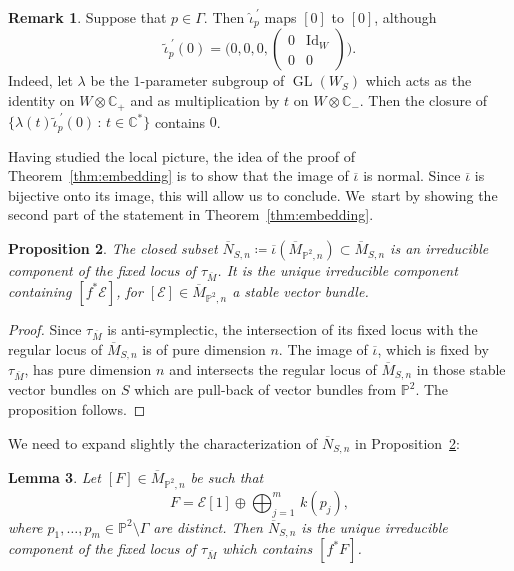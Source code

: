 \documentclass[11pt]{article}
\newcommand{\CC}{{\mathbb C}}\let\C\CC
\newcommand{\PP}{{\mathbb P}}\let\P\PP
\newcommand\cE{\mathcal{E}}
\DeclareMathOperator{\GL}{GL}
\DeclareMathOperator{\Id}{Id}
\let\ov\overline
\newtheorem{lemm}{Lemma}[section]
\newtheorem{prop}[lemm]{Proposition}
\theoremstyle{definition}
\newtheorem{rema}[lemm]{Remark}
\begin{document}
\begin{rema}\label{rmk:0Case2}
Suppose that $p\in\Gamma$.
Then
$\widehat{\iota}_p^{\ \prime}$ maps $[0]$ to $[0]$, although
\[
\widetilde{\iota}_p^{\ \prime}(0)=\biggl(0,0,0,\begin{pmatrix}0&\Id_W\\ 0&0\end{pmatrix}\biggr).
\]
Indeed, let $\lambda$ be the $1$-parameter subgroup of $\GL(W_S)$ which acts as the identity on $W\otimes\CC_{+}$ and as multiplication by $t$ on $W\otimes\CC_{-}$.
Then the closure of $\{\lambda(t)\widetilde{\iota}_p^{\ \prime}(0) \,:\, t\in \CC^{*}\}$ contains $0$.
\end{rema}

Having studied the local picture, the idea of the proof of Theorem~\ref{thm:embedding} is to show that the image of $\overline{\iota}$ is normal. Since $\overline{\iota}$ is bijective onto its image, this will allow us to conclude. We~start by showing the second part of the statement in Theorem~\ref{thm:embedding}.

\begin{prop}\label{prop:irrcmpfix}
The closed subset $\overline{N}_{S,n}\coloneqq\overline{\iota}(\overline{M}_{\PP^2,n})\subset\ov{M}_{S,n}$ is an irreducible component of the fixed locus of $\tau_{\overline{M}}$.
It is the unique irreducible component containing $[f^*\cE]$, for $[\cE]\in\overline{M}_{\PP^2,n}$ a stable vector bundle.
\end{prop}

\begin{proof}
Since $\tau_{\overline{M}}$ is anti-symplectic, the intersection of its fixed locus with the regular locus of $\overline{M}_{S,n}$ is of pure dimension $n$.
The image of $\overline{\iota}$, which is fixed by~$\tau_{\overline{M}}$, has pure dimension $n$ and intersects the regular locus of $\overline{M}_{S,n}$ in those stable vector bundles on $S$ which are pull-back of vector bundles from $\PP^2$.
The proposition follows.
\end{proof}

We need to expand slightly the characterization of $\ov{N}_{S,n}$ in Proposition~\ref{prop:irrcmpfix}:

\begin{lemm}\label{lem:UniqueFixedComponent}
Let $[F]\in\overline{M}_{\PP^2,n}$ be such that\vspace*{-3pt}
\[
F=\cE[1]\oplus \bigoplus_{j=1}^m\, k(p_j),
\]
where $p_1,\dots,p_m\in \PP^2\setminus\mathsf{\Gamma}$
are distinct. Then $\overline{N}_{S,n}$ is the unique irreducible component of the fixed locus of $\tau_{\overline{M}}$ which contains $[f^*F]$.
\end{lemm}
\end{document}
